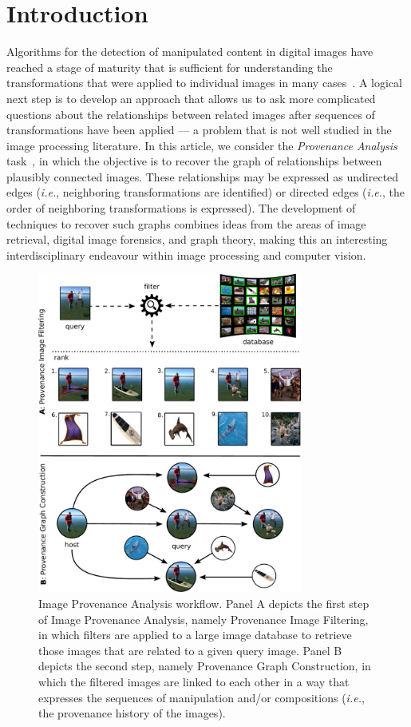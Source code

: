 \section{Introduction}
\label{sec:intro}

Algorithms for the detection of manipulated content in digital images have reached a stage of maturity that is sufficient for understanding the transformations that were applied to individual images in many cases~\cite{farid2009image,Rocha:CSUR:2011,farid2017detect}.
A logical next step is to develop an approach that allows us to ask more complicated questions about the relationships between related images after sequences of transformations have been applied --- a problem that is not well studied in the image processing literature.
In this article, we consider the \textit{Provenance Analysis} task~\cite{Dias_2012,Dias_2013}, in which the objective is to recover the graph of relationships between plausibly connected images. These relationships may be expressed as undirected edges (\textit{i.e.}, neighboring transformations are identified) or directed edges (\textit{i.e.}, the order of neighboring transformations is expressed).
The development of techniques to recover such graphs combines ideas from the areas of image retrieval, digital image forensics, and graph theory, making this an interesting interdisciplinary endeavour within image processing and computer vision. 

\begin{figure}[t]
\centering
\vspace{-0.3cm}
\includegraphics[width=8.7cm]{figures/teaser7.pdf}
\caption[Image Provenance Analysis]{Image Provenance Analysis workflow.
Panel A depicts the first step of Image Provenance Analysis, namely Provenance Image Filtering, in which filters are applied to a large image database to retrieve those images that are related to a given query image.
Panel B depicts the second step, namely Provenance Graph Construction, in which the filtered images are linked to each other in a way that expresses the sequences of manipulation and/or compositions (\textit{i.e.}, the provenance history of the images).}
\label{fig:teaser}
\end{figure}

